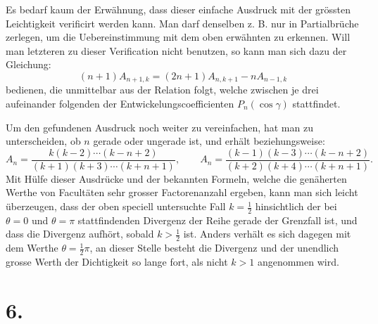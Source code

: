 \documentclass[11pt]{article}
\begin{document}
Es bedarf kaum der Erwähnung, dass dieser einfache Ausdruck mit der grössten Leichtigkeit verificirt werden kann. Man darf denselben z. B. nur in Partialbrüche zerlegen, um die Uebereinstimmung mit dem oben erwähnten zu erkennen. Will man letzteren zu dieser Verification nicht benutzen, so kann man sich dazu der Gleichung:
\[
 (n+1)A_{n+1,k}=(2n+1)A_{n,k+1}-nA_{n-1,k}
\]
bedienen, die unmittelbar aus der Relation folgt, welche zwischen je drei aufeinander folgenden der Entwickelungscoefficienten $P_n(\cos\gamma)$ stattfindet.

Um den gefundenen Ausdruck noch weiter zu vereinfachen, hat man zu unterscheiden, ob $n$ gerade oder ungerade ist, und erhält beziehungsweise:
\[
 A_n=\frac{k(k-2)\cdots(k-n+2)}{(k+1)(k+3)\cdots(k+n+1)},
\qquad
 A_n=\frac{(k-1)(k-3)\cdots(k-n+2)}{(k+2)(k+4)\cdots(k+n+1)}.
\]
Mit Hülfe dieser Ausdrücke und der bekannten Formeln, welche die genäherten Werthe von Facultäten sehr grosser Factorenanzahl ergeben, kann man sich leicht überzeugen, dass der oben speciell untersuchte Fall $k=\frac12$ hinsichtlich der bei $\theta=0$ und $\theta=\pi$ stattfindenden Divergenz der Reihe gerade der Grenzfall ist, und dass die Divergenz aufhört, sobald $k>\frac12$ ist. Anders verhält es sich dagegen mit dem Werthe $\theta=\frac12\pi$, an dieser Stelle besteht die Divergenz und der unendlich grosse Werth der Dichtigkeit so lange fort, als nicht $k>1$ angenommen wird.

\section*{6.}
\end{document}
